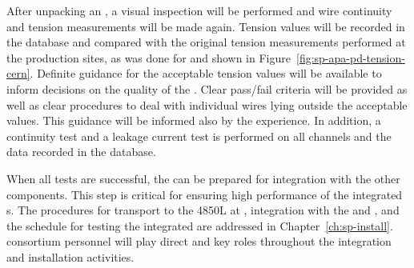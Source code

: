 After unpacking an ,  a visual inspection will be performed and wire continuity and tension measurements will be made again. 
Tension values will be recorded in the database and compared with the original tension measurements performed at the production sites, as was done for  and shown in Figure~\ref{fig:sp-apa-pd-tension-cern}. Definite guidance for the acceptable tension values will be available to inform decisions on the quality of the . Clear pass/fail criteria %
will be provided as well as clear procedures to deal with individual wires lying outside the acceptable values. %
This guidance will be informed also by the  experience. %
In addition, a continuity test and a leakage current test is performed on all channels and the data recorded in the database. 


When all tests are successful, %
the  can be prepared 
for integration with the other components. %
This step is critical for ensuring high performance of the integrated s. The procedures for  transport to the 4850L at , integration with the  and , and the schedule for testing the integrated  are addressed in %
Chapter~\ref{ch:sp-install}.  consortium personnel will play direct and key roles throughout the integration and installation activities.  



